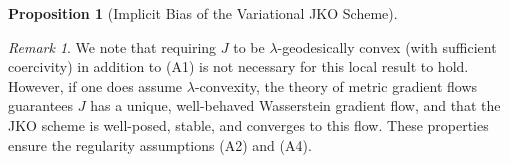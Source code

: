 \documentclass[reqno,11pt,letterpaper]{amsart}
\theoremstyle{plain}
\newtheorem{prop}{Proposition}
\theoremstyle{definition}
\theoremstyle{remark}
\newtheorem{remark}{Remark}
\newcommand{\wass}{\mathrm{GF}}
\DeclareMathOperator*{\argmin}{arg\,min}
\newcommand{\wagrad}{\nabla \frac{\delta J}{\delta \rho}}
\newcommand{\wadel}{\frac{\delta J}{\delta \rho}}
\begin{document}
\begin{prop}[Implicit Bias of the Variational JKO Scheme]

\end{prop}

\begin{remark}
    We note that requiring $J$ to be $\lambda$-geodesically convex (with sufficient coercivity) in addition to (A1) is not necessary for this local result to hold. However, if one does assume $\lambda$-convexity, the theory of metric gradient flows \cite{AGS2008} guarantees $J$ has a unique, well-behaved Wasserstein gradient flow, and that the JKO scheme is well-posed, stable, and converges to this flow. These properties ensure the regularity assumptions (A2) and (A4).
\end{remark}

\end{document}
